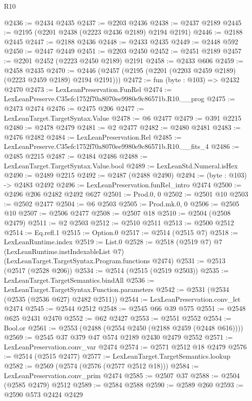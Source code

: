 \begin{lexlean}{R10}
\begin{coremodule}
@2436 := @2434 @2435
@2437 := @2203 @2436
@2438 := @2437 @2189
@2445 := @2195 (@2201 @2438 (@2223 @2436 @2189) @2194 @2191)
@2446 := @2188 @2445
@2447 := @2188 @2436
@2448 := @2433 @2435
@2449 := @2448 @592
@2450 := @2447 @2449
@2451 := @2203 @2450
@2452 := @2451 @2189
@2457 := @2201 @2452 (@2223 @2450 @2189) @2191
@2458 := @2433 @606
@2459 := @2458 @2435
@2470 := @2446 (@2457 (@2195 (@2201 (@2203 @2459 @2189) (@2223 @2459 @2189) @2194 @2191)))
@2472 := fun (byte : @103) => @2432 @2470
@2473 := LexLeanPreservation.FunRel
@2474 := LexLeanPreserve.C35efc1752f70a8070ee9980e9c86571b.R10.__prog
@2475 := @2473 @2474
@2476 := @2475 @206
@2477 := LexLeanTarget.TargetSyntax.Value
@2478 := @6 @2477
@2479 := @391 @2215
@2480 := @2478 @2479
@2481 := @2 @2477
@2482 := @2480 @2481
@2483 := @2476 @2482
@2484 := LexLeanPreservation.Rel
@2485 := LexLeanPreserve.C35efc1752f70a8070ee9980e9c86571b.R10.__fits_4
@2486 := @2485 @2215
@2487 := @2484 @2486
@2488 := LexLeanTarget.TargetSyntax.Value.bool
@2489 := LexLeanStd.Numeral.isHex
@2490 := @2489 @2215
@2492 := @2487 (@2488 @2490)
@2494 := (byte : @103) -> @2483 @2492
@2496 := LexLeanPreservation.funRel_intro @2474
@2500 := @2496 @206 @2482 @2492 @627
@2501 := Prod.{0, 0}
@2502 := @2501 @10
@2503 := @2502 @2477
@2504 := @6 @2503
@2505 := Prod.mk.{0, 0}
@2506 := @2505 @10
@2507 := @2506 @2477
@2508 := @2507 @18
@2510 := @2504 (@2508 @2479)
@2511 := @2 @2503
@2512 := @2510 @2511
@2513 := @2500 @2512
@2514 := Eq.refl.{1}
@2515 := Option.{0}
@2517 := @2514 (@2515 @7)
@2518 := LexLeanRuntime.index
@2519 := List.{0}
@2528 := @2518
    (@2519 @7)
    @7
    (LexLeanRuntime.instIndexableList @7)
    (LexLeanTarget.TargetSyntax.Program.functions @2474)
@2531 := @2513 (@2517 (@2528 @206))
@2534 := @2514 (@2515 (@2519 @2503))
@2535 := LexLeanTarget.TargetSemantics.bindAll
@2536 := LexLeanTarget.TargetSyntax.Function.parameters
@2542 := @2531 (@2534 (@2535 (@2536 @627) @2482 @2511))
@2544 := LexLeanPreservation.conv_let @2474
@2545 := @2544 @2512
@2548 := @2545 @66 @39 @575
@2551 := @2548 @625 @2431 @2470
@2552 := @62 @2427
@2553 := @2551 @2552
@2554 := Bool.or
@2561 := @2553 (@2488 (@2554 @2450 (@2188 @2459 (@2448 @616))))
@2569 := @2545 @37 @379 @47 @574 @2189 @2430 @2479 @2552
@2571 := LexLeanPreservation.conv_var @2474
@2574 := @2571 @2512 @18 @2479
@2576 := @2514 (@2515 @2477)
@2577 := LexLeanTarget.TargetSemantics.lookup
@2582 := @2569 (@2574 (@2576 (@2577 @2512 @18)))
@2584 := LexLeanPreservation.conv_prim @2474
@2585 := @2507 @37
@2588 := @2504 (@2585 @2479) @2512
@2589 := @2584 @2588
@2590 := @2589 @260
@2593 := @2590 @573 @2424 @2429

\end{coremodule}
\end{lexlean}
